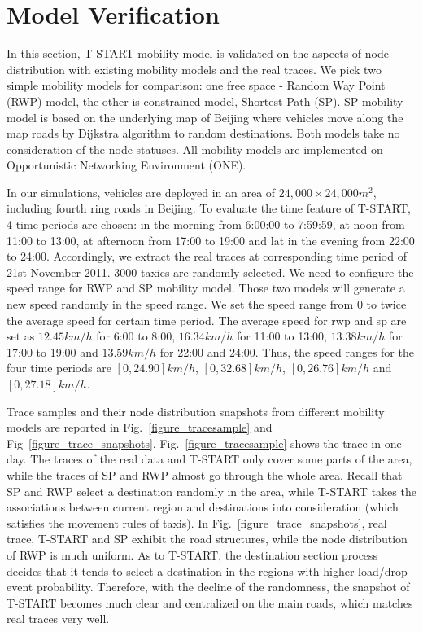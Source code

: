 \section{Model Verification}
\label{section_model_varification}

In this section, T-START mobility model is validated on the aspects of node distribution with existing mobility models and the real traces. We pick two simple mobility models for comparison: one free space - Random Way Point (RWP) model, the other is constrained model, Shortest Path (SP).  SP mobility model is based on the underlying map of Beijing where vehicles move along the map roads by Dijkstra algorithm to random destinations. Both models take no consideration of the node statuses. All mobility models are implemented on Opportunistic Networking Environment (ONE)\cite{KeranenOtt-155}.

In our simulations, vehicles are deployed in an area of $24,000\times 24,000 m^2$, including fourth ring roads in Beijing.
To evaluate the time feature of T-START, 4 time periods are chosen: in the morning from 6:00:00 to 7:59:59, at noon from 11:00 to 13:00, at afternoon from 17:00 to 19:00 and lat in the evening from 22:00 to 24:00. Accordingly, we extract the real traces at corresponding time period of 21st November 2011.
3000 taxies are randomly selected. 
We need to configure the speed range for RWP and SP mobility model. Those two models will generate a new speed randomly in the speed range. We set the speed range from 0 to twice the average speed for certain time period.
The average speed for rwp and sp are set as $12.45 km/h$ for 6:00 to 8:00, $16.34km/h$ for 11:00 to 13:00, $13.38km/h$ for 17:00 to 19:00 and $13.59 km/h$ for 22:00 and 24:00. 
Thus, the speed ranges for the four time periods are $[0, 24.90]km/h$, $[0, 32.68]km/h$, $[0, 26.76]km/h$ and $[0, 27.18]km/h$.

Trace samples and their node distribution snapshots from different mobility models are reported in Fig.~\ref{figure_tracesample} and Fig~\ref{figure_trace_snapshots}. Fig.~\ref{figure_tracesample} shows the trace in one day. The traces of the real data and T-START only cover some parts of the area, while the traces of SP and RWP almost go through the whole area. Recall that SP and RWP select a destination randomly in the area, while T-START takes the associations between current region and destinations into consideration (which satisfies the movement rules of taxis). In Fig.~\ref{figure_trace_snapshots}, real trace, T-START and SP exhibit the road structures, while the node distribution of RWP is much uniform. As to T-START, the destination section process decides that it tends to select a destination in the regions with higher load/drop event probability. Therefore, with the decline of the randomness, the snapshot of T-START becomes much clear and centralized on the main roads, which matches real traces very well.

